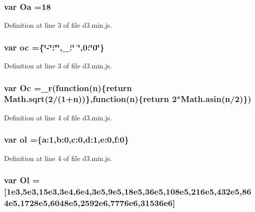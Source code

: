 \subsubsection[{Oa}]{\setlength{\rightskip}{0pt plus 5cm}var Oa =18}\label{d3_8min_8js_a5b00c9f8d63bf67e6474af613a74db19}


Definition at line 3 of file d3.\+min.\+js.

\subsubsection[{oc}]{\setlength{\rightskip}{0pt plus 5cm}var oc =\{\char`\"{}-\/\char`\"{}\+:\char`\"{}\char`\"{},\+\_\+\+:\char`\"{} \char`\"{},0\+:\char`\"{}0\char`\"{}\}}\label{d3_8min_8js_a927c0fd01c362ba140e8cbf95ef337bc}


Definition at line 3 of file d3.\+min.\+js.

\subsubsection[{Oc}]{\setlength{\rightskip}{0pt plus 5cm}var Oc ={\bf \+\_\+r}(function({\bf n})\{{\bf return} {\bf Math.\+sqrt}(2/(1+{\bf n}))\},function({\bf n})\{{\bf return} 2$\ast$Math.\+asin({\bf n}/2)\})}\label{d3_8min_8js_a3d6f8eba03cffbd91fe6b64bb83b1c1a}


Definition at line 4 of file d3.\+min.\+js.

\subsubsection[{ol}]{\setlength{\rightskip}{0pt plus 5cm}var ol =\{a\+:1,b\+:0,c\+:0,d\+:1,e\+:0,f\+:0\}}\label{d3_8min_8js_a809dc8438e532e9e022eb3e842942966}


Definition at line 4 of file d3.\+min.\+js.

\subsubsection[{Ol}]{\setlength{\rightskip}{0pt plus 5cm}var Ol =[1e3,5e3,15e3,3e4,6e4,3e5,9e5,18e5,36e5,108e5,216e5,432e5,864e5,1728e5,6048e5,2592e6,7776e6,31536e6]}\label{d3_8min_8js_a732bd488204569787ad8bfc2314d7943}


